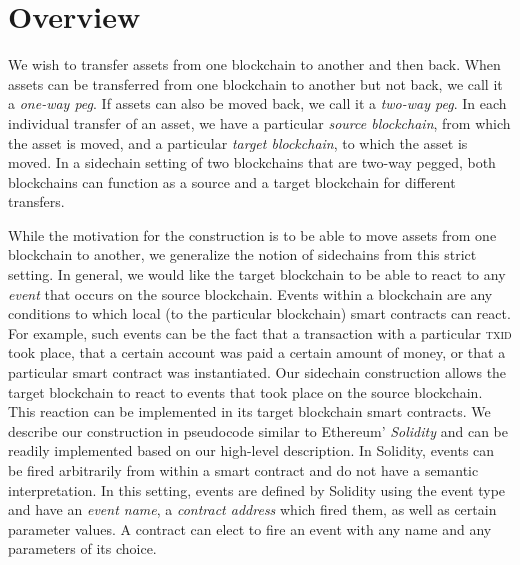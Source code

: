 \section{Overview}
We wish to transfer assets from one blockchain to another and then back. When
assets can be transferred from one blockchain to another but not back, we call
it a \emph{one-way peg}. If assets can also be moved back, we call it a
\emph{two-way peg}. In each individual transfer of an asset, we have a
particular \emph{source blockchain}, from which the asset is moved, and a
particular \emph{target blockchain}, to which the asset is moved. In a sidechain
setting of two blockchains that are two-way pegged, both blockchains can
function as a source and a target blockchain for different transfers.

While the motivation for the construction is to be able to move assets from one
blockchain to another, we generalize the notion of sidechains from this strict
setting. In general, we would like the target blockchain to be able to react to
any \emph{event} that occurs on the source blockchain. Events within a
blockchain are any conditions to which local (to the particular blockchain)
smart contracts can react. For example, such events can be the fact that a
transaction with a particular \textsc{txid} took place, that a certain account
was paid a certain amount of money, or that a particular smart contract was
instantiated. Our sidechain construction allows the target blockchain to react
to events that took place on the source blockchain. This reaction can be
implemented in its target blockchain smart contracts. We describe our
construction in pseudocode similar to Ethereum' \emph{Solidity} and can be
readily implemented based on our high-level description. In Solidity, events can
be fired arbitrarily from within a smart contract and do not have a semantic
interpretation. In this setting, events are defined by Solidity using the
\textsf{event} type and have an \emph{event name}, a \emph{contract address}
which fired them, as well as certain parameter values. A contract can elect to
fire an event with any name and any parameters of its choice.


